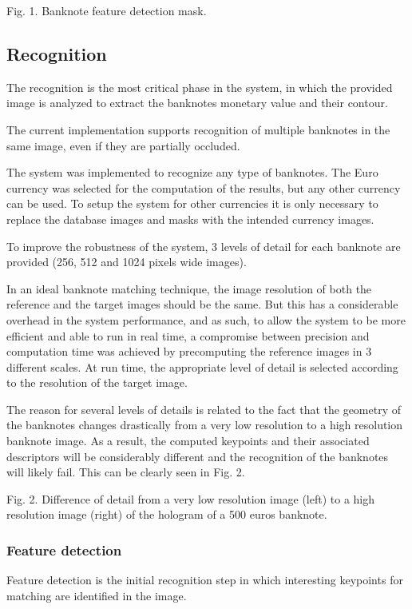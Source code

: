 Fig. 1. Banknote feature detection mask.


\subsection{Recognition}

The recognition is the most critical phase in the system, in which the provided image is analyzed to extract the banknotes monetary value and their contour.

The current implementation supports recognition of multiple banknotes in the same image, even if they are partially occluded.

The system was implemented to recognize any type of banknotes. The Euro currency was selected for the computation of the results, but any other currency can be used. To setup the system for other currencies it is only necessary to replace the database images and masks with the intended currency images.

To improve the robustness of the system, 3 levels of detail for each banknote are provided (256, 512 and 1024 pixels wide images).

In an ideal banknote matching technique, the image resolution of both the reference and the target images should be the same. But this has a considerable overhead in the system performance, and as such, to allow the system to be more efficient and able to run in real time, a compromise between precision and computation time was achieved by precomputing the reference images in 3 different scales. At run time, the appropriate level of detail is selected according to the resolution of the target image.

The reason for several levels of details is related to the fact that the geometry of the banknotes changes drastically from a very low resolution to a high resolution banknote image. As a result, the computed keypoints and their associated descriptors will be considerably different and the recognition of the banknotes will likely fail. This can be clearly seen in Fig. 2.

Fig. 2. Difference of detail from a very low resolution image (left) to a high resolution image (right) of the hologram of a 500 euros banknote.


\subsubsection{Feature detection}
Feature detection is the initial recognition step in which interesting keypoints for matching are identified in the image.

